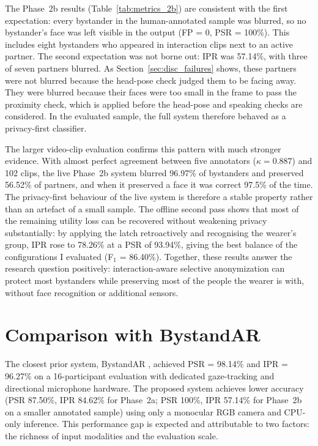 The Phase~2b results (Table~\ref{tab:metrics_2b}) are consistent with the first
expectation: every bystander in the human-annotated sample was blurred, so no
bystander's face was left visible in the output (FP = 0, PSR = 100\%). This includes
eight bystanders who appeared in interaction clips next to an active partner. The
second expectation was not borne out: IPR was 57.14\%, with three of seven partners
blurred. As Section~\ref{sec:disc_failures} shows, these partners were not blurred
because the head-pose check judged them to be facing away. They were blurred because
their faces were too small in the frame to pass the proximity check, which is applied
before the head-pose and speaking checks are considered. In the
evaluated sample, the full system therefore behaved as a privacy-first classifier.

The larger video-clip evaluation confirms this pattern with much stronger evidence.
With almost perfect agreement between five annotators ($\kappa = 0.887$) and 102 clips,
the live Phase~2b system blurred 96.97\% of bystanders and preserved 56.52\% of
partners, and when it preserved a face it was correct 97.5\% of the time. The
privacy-first behaviour of the live system is therefore a stable property rather
than an artefact of a small sample. The offline second pass shows that most of the
remaining utility loss can be recovered without weakening privacy substantially:
by applying the latch retroactively and recognising the wearer's group, IPR rose to
78.26\% at a PSR of 93.94\%, giving the best balance of the configurations I
evaluated (F$_1$ = 86.40\%). Together, these results answer the research question
positively: interaction-aware selective anonymization can protect most bystanders
while preserving most of the people the wearer is with, without face recognition or
additional sensors.

\section{Comparison with BystandAR}
\label{sec:disc_bystandar}

The closest prior system, BystandAR \citep{bystandar}, achieved PSR = 98.14\% and
IPR = 96.27\% on a 16-participant evaluation with dedicated gaze-tracking and
directional microphone hardware. The proposed system achieves lower accuracy (PSR
87.50\%, IPR 84.62\% for Phase~2a; PSR 100\%, IPR 57.14\% for Phase~2b on a smaller
annotated sample) using only a monocular RGB camera and CPU-only inference. This
performance gap is expected and attributable to two factors: the richness of input
modalities and the evaluation scale.

